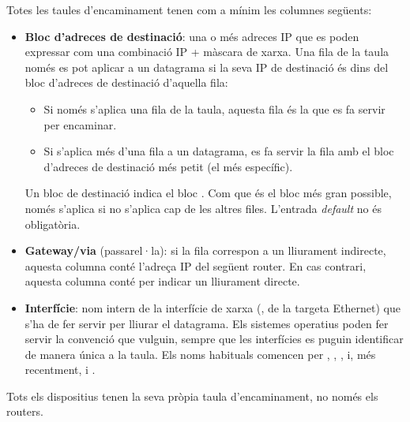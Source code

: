 Totes les taules d'encaminament tenen com a mínim les columnes següents:
\begin{itemize}
\item \textbf{Bloc d'adreces de destinació}: una o més adreces IP que es poden expressar com una combinació IP + màscara de xarxa.
  Una fila de la taula només es pot aplicar a un datagrama si la seva IP de destinació és dins del bloc d'adreces de destinació d'aquella fila:
  \begin{itemize}
  \item Si només s'aplica una fila de la taula, aquesta fila és la que es fa servir per encaminar.
  \item Si s'aplica més d'una fila a un datagrama, es fa servir la fila amb el bloc d'adreces de destinació més petit 
    (el més específic).
  \end{itemize}
  Un bloc de destinació  indica el bloc .
  Com que és el bloc més gran possible, només s'aplica si no s'aplica cap de les altres files. 
  L'entrada \textit{default} no és obligatòria.\\[-0.3cm]
  
\item \textbf{Gateway/via} (passarel·la): si la fila correspon a un lliurament indirecte, aquesta columna conté l'adreça IP
  del següent router. En cas contrari, aquesta columna conté  per indicar un lliurament directe.\\[-0.3cm]
  
\item \textbf{Interfície}: nom intern de la interfície de xarxa (\eg, de la targeta Ethernet) que s'ha de fer servir per lliurar el 
  datagrama. Els sistemes operatius poden fer servir la convenció que vulguin, sempre que les interfícies es puguin identificar de manera única a la taula.
  Els noms habituals comencen per , , , 
  i, més recentment,  i .
\end{itemize}

\begin{remark}
Tots els dispositius tenen la seva pròpia taula d'encaminament, no només els routers.
\end{remark}

